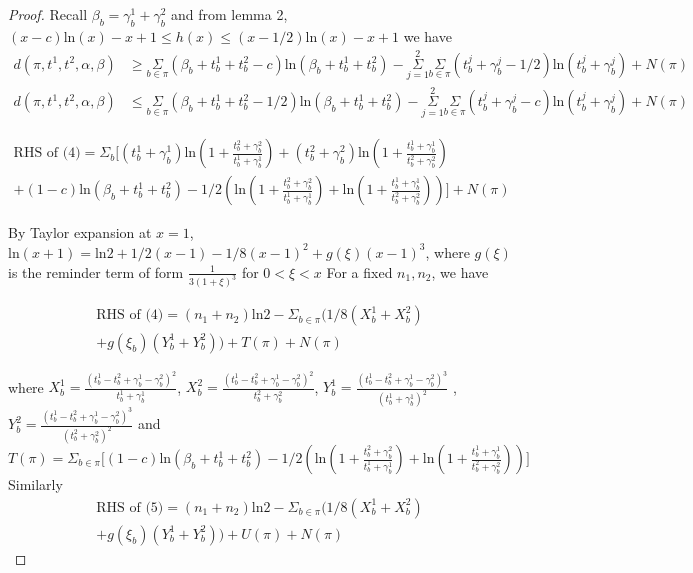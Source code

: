 \documentclass[aoas,preprint]{imsart}
\begin{document}
\begin{proof}
Recall $\beta_b = \gamma_b^1 + \gamma_b^2$ and from lemma 2, $(x - c)\text{ln}(x) - x + 1 \leq h(x) \leq (x - 1/2)\text{ln}(x) - x + 1$ we have 
\begin{align}
d(\pi, t^1, t^2, \alpha, \beta) &\geq \underset{b\in \pi}\Sigma (\beta_b + t_b^1 + t_b^2 - c) \text{ln}(\beta_b  + t_b^1 + t_b^2) - \overset{2}{\underset{j = 1}{\Sigma}}\underset{b\in\pi}\Sigma (t_b^j + \gamma_b^j - 1/2) \text{ln}(t_b^j + \gamma_b^j) + N(\pi)\\
d(\pi, t^1, t^2, \alpha, \beta) &\leq \underset{b\in \pi}\Sigma (\beta_b + t_b^1 + t_b^2 - 1 / 2) \text{ln}(\beta_b  + t_b^1 + t_b^2) - \overset{2}{\underset{j = 1}{\Sigma}}\underset{b\in\pi}\Sigma (t_b^j + \gamma_b^j - c) \text{ln}(t_b^j + \gamma_b^j) + N(\pi)
\end{align}


\begin{eqnarray*}
\text{RHS of (4)} = \Sigma_b \big[ (t_b^1 + \gamma_b^1) \text{ln}(1 + \frac{t_b^2 + \gamma_b^2}{t_b^1 + \gamma_b^1})
 + (t_b^2 + \gamma_b^2) \text{ln}(1 + \frac{t_b^1 + \gamma_b^1}{t_b^2 + \gamma_b^2})\\
 + (1 - c) \text{ln}(\beta_b + t_b^1 + t_b^2) 
  - 1/2(\text{ln}(1 + \frac{t_b^2 + \gamma_b^2}{t_b^1 + \gamma_b^1}) + \text{ln}(1 + \frac{t_b^1 + \gamma_b^1}{t_b^2 + \gamma_b^2}))\big] + N(\pi)
\end{eqnarray*}

By Taylor expansion at $x= 1$, $\text{ln}(x + 1) = \text{ln}2 + 1/2(x - 1) - 1/8(x - 1)^2 + g(\xi) (x - 1)^3$, where $g(\xi)$ is the reminder term of form $\frac{1}{3(1+\xi)^3}$ for $ 0 < \xi < x$
For a fixed $n_1, n_2$, we have 

\begin{eqnarray*}
\text{RHS of (4)} = (n_1 + n_2) \text{ln}2  - \Sigma_{b\in\pi}(1/8 (X_b^1 + X_b^2)\\
+ g(\xi_b) (Y_b^1 + Y_b^2) )+ T(\pi) + N(\pi)
\end{eqnarray*}

where $X_b^1 = \frac{(t_b^1 - t_b^2 + \gamma_b^1 - \gamma_b^2)^2}{t_b^1 + \gamma_b^1}$, $X_b^2 =  \frac{(t_b^1 - t_b^2 + \gamma_b^1 - \gamma_b^2)^2}{t_b^2 + \gamma_b^2}$,
$Y_b^1 = \frac{(t_b^1 - t_b^2 + \gamma_b^1 - \gamma_b^2)^3}{(t_b^1 + \gamma_b^1)^2} $ , $Y_b^2 =  \frac{(t_b^1 - t_b^2 + \gamma_b^1 - \gamma_b^2)^3}{(t_b^2 + \gamma_b^2)^2}$
and $T(\pi) = \Sigma_{b\in\pi}\big[(1 - c) \text{ln}(\beta_b + t_b^1 + t_b^2) 
  - 1/2(\text{ln}(1 + \frac{t_b^2 + \gamma_b^2}{t_b^1 + \gamma_b^1}) + \text{ln}(1 + \frac{t_b^1 + \gamma_b^1}{t_b^2 + \gamma_b^2}))\big]$\\
Similarly
\begin{eqnarray*}
\text{RHS of (5)} = (n_1 + n_2) \text{ln}2  -\Sigma_{b\in\pi}(1/8 (X_b^1 + X_b^2)\\
+ g(\xi_b) (Y_b^1 + Y_b^2)) + U(\pi) + N(\pi)
\end{eqnarray*}
  

\end{proof}
\end{document}
